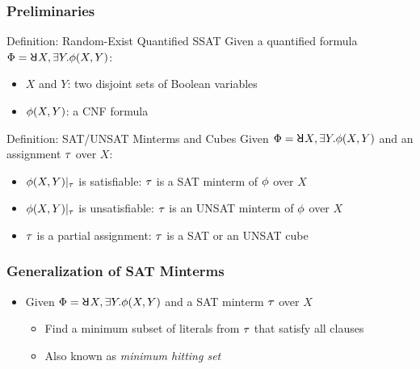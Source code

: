 \begin{frame}
    \frametitle{Preliminaries}
    \begin{block}{Definition: Random-Exist Quantified SSAT}
        Given a quantified formula $\Qf=\random{} X,\exists Y.\pf(X,Y)$:
        \pause
        \begin{itemize}
            \item $X$ and $Y$: two disjoint sets of Boolean variables
                  \pause
            \item $\phi(X,Y)$: a CNF formula
                  \pause
        \end{itemize}
    \end{block}
    \begin{block}{Definition: SAT/UNSAT Minterms and Cubes}
        Given $\Qf=\random{} X,\exists Y.\pf(X,Y)$ and an assignment $\tau$ over $X$:
        \pause
        \begin{itemize}
            \item $\phi(X,Y)|_{\tau}$ is satisfiable: $\tau$ is a SAT minterm of $\phi$ over $X$
                  \pause
            \item $\phi(X,Y)|_{\tau}$ is unsatisfiable: $\tau$ is an UNSAT minterm of $\phi$ over $X$
                  \pause
            \item $\tau$ is a partial assignment: $\tau$ is a SAT or an UNSAT cube
        \end{itemize}
    \end{block}
\end{frame}

\begin{frame}
    \frametitle{Generalization of SAT Minterms}
    \begin{itemize}
        \item Given $\Qf=\random{} X,\exists Y.\pf(X,Y)$ and a SAT minterm $\tau$ over $X$
              \pause
              \begin{itemize}
                  \item Find a minimum subset of literals from $\tau$ that satisfy all clauses
                        \pause
                  \item Also known as \textit{minimum hitting set}
              \end{itemize}
    \end{itemize}
\end{frame}

